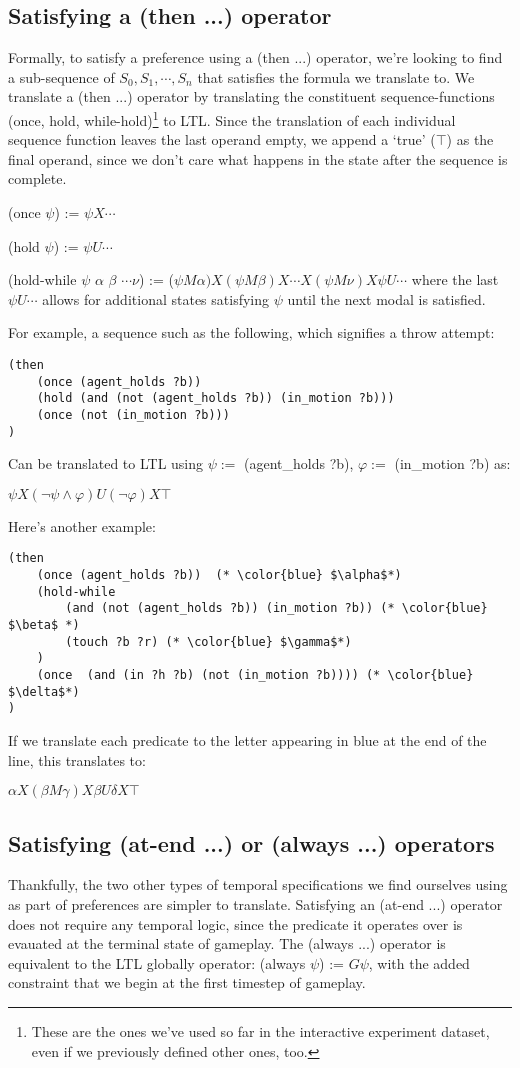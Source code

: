 \documentclass{article}
\begin{document}
\subsection{Satisfying a (then ...) operator}
Formally, to satisfy a preference using a (then ...) operator, we're looking to find a sub-sequence of $S_0, S_1, \cdots, S_n$ that satisfies the formula we translate to.
We translate a (then ...) operator by translating the constituent sequence-functions (once, hold, while-hold)\footnote{These are the ones we've used so far in the interactive experiment dataset, even if we previously defined other ones, too.} to LTL.
Since the translation of each individual sequence function leaves the last operand empty, we append a `true' ($\top$) as the final operand, since we don't care what happens in the state after the sequence is complete.

(once $\psi$) := $\psi X \cdots$

(hold $\psi$) := $\psi U \cdots$

(hold-while $\psi$ $\alpha$ $\beta$ $\cdots \nu$) := ($\psi M \alpha) X (\psi M \beta) X \cdots X (\psi M \nu) X \psi U \cdots$ where the last $\psi U \cdots$ allows for additional states satisfying $\psi$ until the next modal is satisfied.

For example, a sequence such as the following, which signifies a throw attempt:
\begin{lstlisting}
(then
    (once (agent_holds ?b))
    (hold (and (not (agent_holds ?b)) (in_motion ?b)))
    (once (not (in_motion ?b)))
)
\end{lstlisting}
Can be translated to LTL using $\psi:=$ (agent_holds ?b), $\varphi:=$ (in_motion ?b) as:

$\psi X (\neg \psi \wedge \varphi) U (\neg \varphi) X \top $

Here's another example:
\begin{lstlisting}
(then
    (once (agent_holds ?b))  (* \color{blue} $\alpha$*)
    (hold-while
        (and (not (agent_holds ?b)) (in_motion ?b)) (* \color{blue} $\beta$ *)
        (touch ?b ?r) (* \color{blue} $\gamma$*)
    )
    (once  (and (in ?h ?b) (not (in_motion ?b)))) (* \color{blue} $\delta$*)
)
\end{lstlisting}
If we translate each predicate to the letter appearing in blue at the end of the line, this translates to:

$\alpha X (\beta M \gamma) X \beta U \delta X \top$

\subsection{Satisfying (at-end ...) or (always ...) operators}
Thankfully, the two other types of temporal specifications we find ourselves using as part of preferences are simpler to translate.
Satisfying an (at-end ...) operator does not require any temporal logic, since the predicate it operates over is evauated at the terminal state of gameplay.
The (always ...) operator is equivalent to the LTL globally operator: (always $\psi$) := $G \psi$, with the added constraint that we begin at the first timestep of gameplay.
\end{document}
